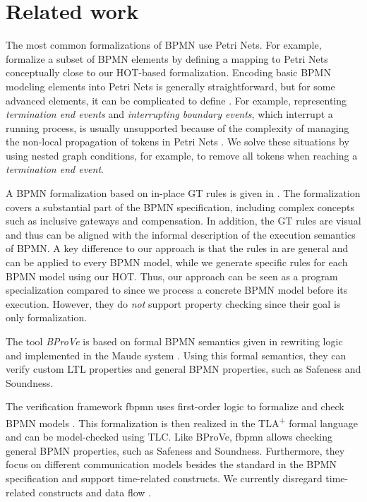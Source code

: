 \documentclass{lmcs} %
\begin{document}
\section{Related work} \label{sec:relatedWork}
The most common formalizations of BPMN use Petri Nets.
For example, \cite{dijkmanSemanticsAnalysisBusiness2008} formalize a subset of BPMN elements by defining a mapping to Petri Nets conceptually close to our HOT-based formalization.
Encoding basic BPMN modeling elements into Petri Nets is generally straightforward, but for some advanced elements, it can be complicated to define \cite{hofstedeWorkflowPatternsExpressive2002}.
For example, representing \textit{termination end events} and \textit{interrupting boundary events}, which interrupt a running process, is usually unsupported because of the complexity of managing the non-local propagation of tokens in Petri Nets \cite{corradiniFormalApproachAnalysis2021}.
We solve these situations by using nested graph conditions, for example, to remove all tokens when reaching a \textit{termination end event}.
 
A BPMN formalization based on in-place GT rules is given in \cite{vangorpVisualTokenbasedFormalization2013}.
The formalization covers a substantial part of the BPMN specification, including complex concepts such as inclusive gateways and compensation.
In addition, the GT rules are visual and thus can be aligned with the informal description of the execution semantics of BPMN.
A key difference to our approach is that the rules in \cite{vangorpVisualTokenbasedFormalization2013} are general and can be applied to every BPMN model, while we generate specific rules for each BPMN model using our HOT.
Thus, our approach can be seen as a program specialization compared to \cite{vangorpVisualTokenbasedFormalization2013} since we process a concrete BPMN model before its execution.
However, they do \textit{not} support property checking since their goal is only formalization.

The tool \textit{BProVe} is based on formal BPMN semantics given in rewriting logic and implemented in the Maude system \cite{corradiniFormalApproachAnalysis2021}.
Using this formal semantics, they can verify custom LTL properties and general BPMN properties, such as Safeness and Soundness.

The verification framework \textsf{fbpmn} uses first-order logic to formalize and check BPMN models \cite{houhouFirstOrderLogicVerification2022}.
This formalization is then realized in the TLA\textsuperscript{+} formal language and can be model-checked using TLC.
Like BProVe, \textsf{fbpmn} allows checking general BPMN properties, such as Safeness and Soundness.
Furthermore, they focus on different communication models besides the standard in the BPMN specification and support time-related constructs.
We currently disregard time-related constructs \cite{duranVerifyingTimedBPMN2017,houhouFirstOrderLogicVerification2022} and data flow \cite{corradiniFormalisingAnimatingMultiple2022,el-saberCMMICMComplianceChecking2015}.
\end{document}
